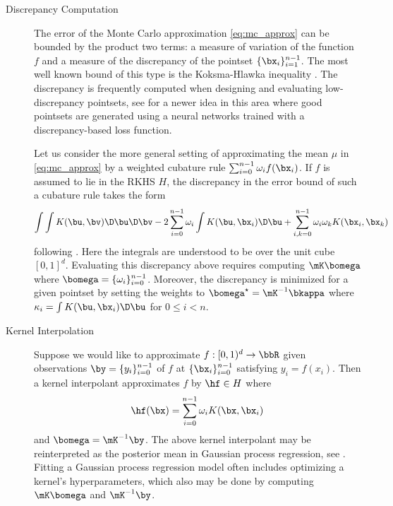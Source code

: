 \documentclass[acmsmall]{acmart}
\begin{document}
\begin{description}
    \item[Discrepancy Computation] The error of the Monte Carlo approximation \eqref{eq:mc_approx} can be bounded by the product two terms: a measure of variation of the function $f$ and a measure of the discrepancy of the pointset $\{\bx_i\}_{i=1}^{n-1}$.  The most well known bound of this type is the Koksma-Hlawka inequality \citep{hickernell.generalized_discrepancy_quadrature_error_bound,dick.high_dim_integration_qmc_way,hickernell1999goodness,niederreiter.qmc_book}. The discrepancy is frequently computed when designing and evaluating low-discrepancy pointsets, see \citep{rusch2024message} for a newer idea in this area where good pointsets are generated using a neural networks trained with a discrepancy-based loss function.  
    
    Let us consider the more general setting of approximating the mean $\mu$ in \eqref{eq:mc_approx} by a weighted cubature rule $\sum_{i=0}^{n-1} \omega_i f(\bx_i)$. If $f$ is assumed to lie in the RKHS $H$, the discrepancy in the error bound of such a cubature rule takes the form
    $$\int \int K(\bu,\bv) \D \bu \D \bv - 2 \sum_{i=0}^{n-1} \omega_i \int K(\bu,\bx_i) \D \bu + \sum_{i,k=0}^{n-1} \omega_i \omega_k K(\bx_i,\bx_k)$$
    following \citep{hickernell.generalized_discrepancy_quadrature_error_bound}. Here the integrals are understood to be over the unit cube $[0,1]^d$. Evaluating this discrepancy above requires computing $\mK \bomega$ where $\bomega = \{\omega_i\}_{i=0}^{n-1}$. Moreover, the discrepancy is minimized for a given pointset by setting the weights to $\bomega^\star = \mK^{-1} \bkappa$ where $\kappa_i = \int K(\bu,\bx_i) \D \bu$ for $0 \leq i < n$.
    \item[Kernel Interpolation] Suppose we would like to approximate $f: [0,1)^d \to \bbR$ given observations $\by = \{y_i\}_{i=0}^{n-1}$ of $f$ at $\{\bx_i\}_{i=0}^{n-1}$ satisfying $y_i = f(x_i)$. Then a kernel interpolant approximates $f$ by $\hf \in H$ where 
    $$\hf(\bx) = \sum_{i=0}^{n-1} \omega_i K(\bx,\bx_i)$$
    and $\bomega = \mK^{-1} \by$. The above kernel interpolant may be reinterpreted as the posterior mean in Gaussian process regression, see \citep{rasmussen.gp4ml}. Fitting a Gaussian process regression model often includes optimizing a kernel's hyperparameters, which also may be done by computing  $\mK \bomega$ and $\mK^{-1} \by$.  %
\end{description}
\end{document}

